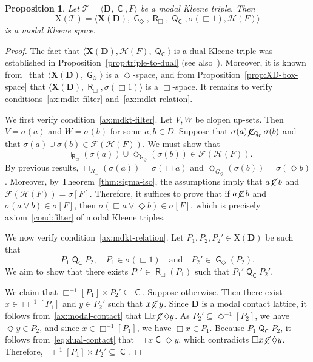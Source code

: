 \documentclass[10pt,a4paper]{amsart}
\newtheorem{proposition}[theorem]{Proposition}
\DeclareMathOperator{\con}{\mathsf{C}}
\DeclareMathOperator{\notcon}{\cancel{ \con}}
\DeclareMathOperator{\Q}{\mathsf{Q}}
\DeclareMathOperator{\G}{\mathsf{G}}
\DeclareMathOperator{\R}{\mathsf{R}}
\newcommand{\D}{\mathbf{D}}
\newcommand{\X}{\mathbf{X}}
\newcommand{\T}{\mathcal{T}}
\begin{document}
\begin{proposition}
\label{prop:triple-to-mdkt}
Let $\T = \langle \D, \con, F \rangle$ be a modal Kleene triple. Then
\[
\mathrm{X}(\T) = \langle \X(\D), \G_\Diamond, \R_\Box, \Q_{\con},\sigma(\Box 1), \mathcal{H}(F) \rangle
\]
is a modal Kleene space.
\end{proposition}
\begin{proof}
The fact that $\langle \X(\D), \mathcal{H}(F) ,\Q_{\con}\rangle$ is a dual Kleene triple was established in Proposition~\ref{prop:triple-to-dual} (see also~\cite{jalali}). Moreover, it is known from~\cite{petrovich1996} that $\langle \X(\D), \G_\Diamond \rangle$ is a $\Diamond$-space, and from Proposition~\ref{prop:XD-box-space} that $\langle \X(\D), \R_\Box, \sigma(\Box 1) \rangle$ is a $\Box$-space. It remains to verify conditions~\eqref{ax:mdkt-filter} and~\eqref{ax:mdkt-relation}.

We first verify condition~\eqref{ax:mdkt-filter}. Let $V, W$ be clopen up-sets. Then $V = \sigma(a)$ and $W = \sigma(b)$ for some $a, b \in D$. Suppose that $\sigma(a) \notcon_{\Q_{\con}} \sigma(b)$ and that $\sigma(a) \cup \sigma(b) \in \mathcal{F}(\mathcal{H}(F))$. We must show that
\[
\Box_{\R_\Box}(\sigma(a)) \cup \Diamond_{\G_\Diamond}(\sigma(b)) \in \mathcal{F}(\mathcal{H}(F)).
\]
By previous results, $\Box_{R_\Box}(\sigma(a)) = \sigma(\Box a)$ and $\Diamond_{G_\Diamond}(\sigma(b)) = \sigma(\Diamond b)$. Moreover, by Theorem~\ref{thm:sigma-iso}, the assumptions imply that $a \notcon b$ and $\mathcal{F}(\mathcal{H}(F)) = \sigma[F]$. Therefore, it suffices to prove that if $a \notcon b$ and $\sigma(a \vee b) \in \sigma[F]$, then $\sigma(\Box a \vee \Diamond b) \in \sigma[F]$, which is precisely axiom~\eqref{cond:filter} of modal Kleene triples.

We now verify condition~\eqref{ax:mdkt-relation}. Let $P_1, P_2, P_2' \in \mathrm{X}(\D)$ be such that
\[
P_1 \Q_{\con} P_2, \quad P_1 \in \sigma(\Box 1) \quad \text{and} \quad P_2' \in \G_\Diamond(P_2).
\]
We aim to show that there exists $P_1' \in \R_\Box(P_1)$ such that $P_1'\Q_{\con} P_2'$.

We claim that $\Box^{-1}[P_1] \times P_2' \subseteq \con$. Suppose otherwise. Then there exist $x \in \Box^{-1}[P_1]$ and $y \in P_2'$ such that $x \notcon y$. Since $\D$ is a modal contact lattice, it follows from~\eqref{ax:modal-contact} that $\Box x \notcon \Diamond y$. As $P_2' \subseteq \Diamond^{-1}[P_2]$, we have $\Diamond y \in P_2$, and since $x \in \Box^{-1}[P_1]$, we have $\Box x \in P_1$. Because $P_1 \Q_{\con} P_2$, it follows from~\eqref{eq:dual-contact} that $\Box x \con \Diamond y$, which contradicts $\Box x \notcon \Diamond y$. Therefore, $\Box^{-1}[P_1] \times P_2' \subseteq \con$.


\end{proof}
\end{document}
